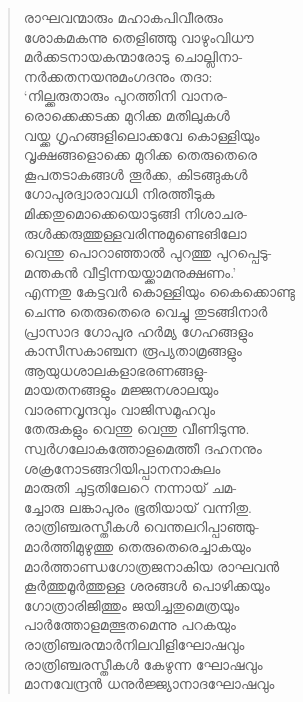 \begin{verse}
രാഘവന്മാരും മഹാകപിവീരരും\\
ശോകമകന്നു തെളിഞ്ഞു വാഴുംവിധൗ\\
മര്‍ക്കടനായകന്മാരോടു ചൊല്ലിനാ-\\
നര്‍ക്കതനയനുമംഗദനും തദാ:\\
‘നില്ക്കരുതാരും പുറത്തിനി വാനര-\\
രൊക്കെക്കടക്ക മുറിക്ക മതിലുകള്‍\\
വയ്ക്ക ഗൃഹങ്ങളിലൊക്കവേ കൊള്ളിയും\\
വൃക്ഷങ്ങളൊക്കെ മുറിക്ക തെരുതെരെ\\
കൂപതടാകങ്ങള്‍ തൂര്‍ക്ക, കിടങ്ങുകള്‍\\
ഗോപുരദ്വാരാവധി നിരത്തീടുക\\
മിക്കതുമൊക്കെയൊടുങ്ങി നിശാചര-\\
രുള്‍ക്കരുത്തുള്ളവരിന്നുമുണ്ടെങിലോ\\
വെന്തു പൊറാഞ്ഞാല്‍ പുറത്തു പുറപ്പെടു-\\
മന്തകന്‍ വീട്ടിന്നയയ്ക്കാമനുക്ഷണം.’\\
എന്നതു കേട്ടവര്‍ കൊള്ളിയും കൈക്കൊണ്ടു\\
ചെന്നു തെരുതെരെ വെച്ചു തുടങ്ങിനാര്‍\\
പ്രാസാദ ഗോപുര ഹര്‍മ്യ ഗേഹങ്ങളും\\
കാസീസകാഞ്ചന രൂപ്യതാമ്രങ്ങളും\\
ആയുധശാലകളാഭരണങ്ങളു-\\
മായതനങ്ങളും മജ്ജനശാലയും\\
വാരണവൃന്ദവും വാജിസമൂഹവും\\
തേരുകളും വെന്തു വെന്തു വീണിടുന്നു.\\
സ്വര്‍ഗലോകത്തോളമെത്തീ ദഹനനും\\
ശക്രനോടങ്ങറിയിപ്പാനനാകുലം\\
മാരുതി ചുട്ടതിലേറെ നന്നായ് ചമ-\\
ച്ചോരു ലങ്കാപുരം ഭൂതിയായ് വന്നിതു.\\
രാത്രിഞ്ചരസ്തീകള്‍ വെന്തലറിപ്പാഞ്ഞു-\\
മാര്‍ത്തിമുഴുത്തു തെരുതെരെച്ചാകയും\\
മാര്‍ത്താണ്ഡഗോത്രജനാകിയ രാഘവന്‍\\
കൂര്‍ത്തുമൂര്‍ത്തുള്ള ശരങ്ങള്‍ പൊഴിക്കയും\\
ഗോത്രാരിജിത്തും ജയിച്ചതുമെത്രയും\\
പാര്‍ത്തോളമത്ഭുതമെന്നു പറകയും\\
രാത്രിഞ്ചരന്മാര്‍നിലവിളിഘോഷവും\\
രാത്രിഞ്ചരസ്തീകള്‍ കേഴുന്ന ഘോഷവും\\
മാനവേന്ദ്രന്‍ ധനുര്‍ജ്ജ്യാനാദഘോഷവും\\

\end{verse}
